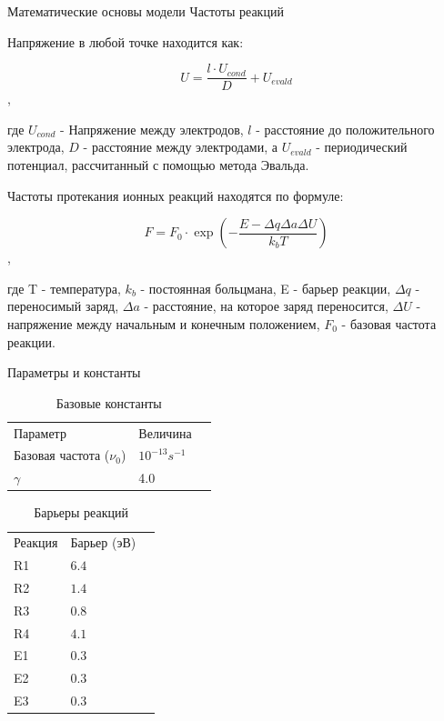 \documentclass{beamer}%
\begin{document}

\begin{frame}{Математические основы модели} {Частоты реакций}

    \small

    Напряжение в любой точке находится как:

    \[U = \frac{l\cdot U_{cond}}{D}+U_{evald}\],

    где \(U_{cond}\) - Напряжение между электродов, \(l\) - расстояние до положительного электрода, \(D\) - расстояние между электродами, а \(U_{evald}\) - периодический потенциал, рассчитанный с помощью метода Эвальда.

    Частоты протекания ионных реакций находятся по формуле:

    \[F = F_0 \cdot \exp{(-\frac{E-\Delta q \Delta a \Delta U}{k_bT})}\],

    где T - температура, \(k_b\) - постоянная больцмана, E - барьер реакции, \(\Delta q\) - переносимый заряд, \(\Delta a\) - расстояние, на которое заряд переносится, \(\Delta U\) - напряжение между начальным и конечным положением, \(F_0\)  - базовая частота реакции.
    

    
\end{frame}


\begin{frame}{Параметры и константы}
    \begin{table}
        \begin{tabular}{llc}
          Параметр & Величина\\ 
          Базовая частота (\(\nu _0\)) &
          \(10^{-13} s^{-1}\) \\
          \(\gamma\) & 4.0 \\
        \end{tabular}
        \caption{Базовые константы}
      \end{table}

      \begin{table}
        \begin{tabular}{llc}
          Реакция & Барьер (эВ) \\ 
          R1 &  \(6.4\) \\
          R2 &  \(1.4\) \\
          R3 &  \(0.8\) \\
          R4 &  \(4.1\) \\
          E1 &  \(0.3\) \\
          E2 &  \(0.3\) \\
          E3 &  \(0.3\) \\
        \end{tabular}
        \caption{Барьеры реакций}
      \end{table}


\end{frame}
\end{document}
